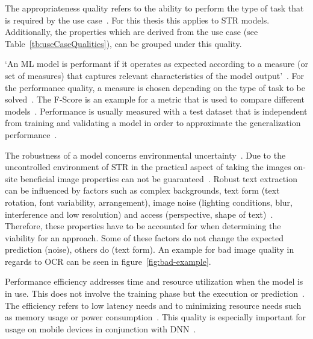 The appropriateness quality refers to the ability to perform the type of task that is required by
the use case~\citep{siebert_construction_2021,nakamichi_requirements-driven_2020}.
For this thesis this applies to \ac{STR} models.
Additionally, the properties which are derived from the use case (see Table~\ref{tb:useCaseQualities}),
can be grouped under this quality.

`An ML model is performant if it operates as expected according to a measure (or set of measures)
that captures relevant characteristics of the model output'~\citep{ashmore_assuring_2021}.
For the performance quality, a measure is chosen depending on the type of task to be
solved~\citep{siebert_construction_2021}.
The F-Score is an example for a metric that is used to compare different
models~\cite{chen_text_2021, long_scene_2021}.
Performance is usually measured with a test dataset that is independent from training and validating
a model in order to approximate the generalization performance~\cite{goodfellow_deep_2016,
nakamichi_requirements-driven_2020}.

The robustness of a model concerns environmental uncertainty~\cite{ashmore_assuring_2021}.
Due to the uncontrolled environment of \ac{STR} in the practical aspect of taking the images on-site
beneficial image properties can not be guaranteed~\citep{chen_text_2021}.
Robust text extraction can be influenced by factors such as complex backgrounds, text form
(text rotation, font variability, arrangement), image noise (lighting conditions, blur,
interference and low resolution) and access (perspective, shape of
text)~\citep{oyedotun_deep_2015,ghosh_visual_2017,chen_text_2021}.
Therefore, these properties have to be accounted for when determining the viability for an approach.
Some of these factors do not change the expected prediction (noise), others do (text
form)\cite{hu_towards_2020}.
An example for bad image quality in regards to \ac{OCR} can be seen in figure~\ref{fig:bad-example}.

Performance efficiency addresses time and resource utilization when the model is in use.
This does not involve the training phase but the execution or
prediction~\citep{siebert_construction_2021}.
The efficiency refers to low latency needs and to minimizing resource needs such as memory
usage or power consumption~\citep{nakamichi_requirements-driven_2020, siebert_construction_2021,
sourvanos_challenges_2018}.
This quality is especially important for usage on mobile devices in conjunction with
\ac{DNN}~\citep{sourvanos_challenges_2018, niu_26ms_2019}.

